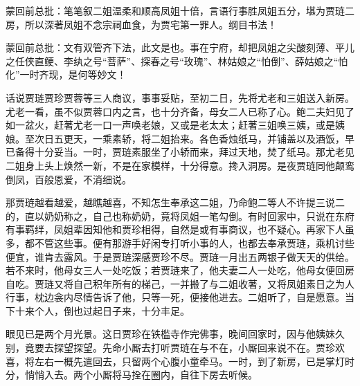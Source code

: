 \begin{parag}
    \begin{note}蒙回前总批：笔笔叙二姐温柔和顺高凤姐十倍，言语行事胜凤姐五分，堪为贾琏二房，所以深著凤姐不念宗祠血食，为贾宅第一罪人。纲目书法！\end{note}
\end{parag}


\begin{parag}
    \begin{note}蒙回前总批：文有双管齐下法，此文是也。事在宁府，却把凤姐之尖酸刻薄、平儿之任侠直鲠、李纨之号“菩萨”、探春之号“玫瑰”、林姑娘之“怕倒”、薛姑娘之“怕化”一时齐现，是何等妙文！\end{note}
\end{parag}


\begin{parag}
    话说贾琏贾珍贾蓉等三人商议，事事妥贴，至初二日，先将尤老和三姐送入新房。尤老一看，虽不似贾蓉口内之言，也十分齐备，母女二人已称了心。鲍二夫妇见了如一盆火，赶著尤老一口一声唤老娘，又或是老太太；赶著三姐唤三姨，或是姨娘。至次日五更天，一乘素轿，将二姐抬来。各色香烛纸马，并铺盖以及酒饭，早已备得十分妥当。一时，贾琏素服坐了小轿而来，拜过天地，焚了纸马。那尤老见二姐身上头上焕然一新，不是在家模样，十分得意。搀入洞房。是夜贾琏同他颠鸾倒凤，百般恩爱，不消细说。
\end{parag}


\begin{parag}
    那贾琏越看越爱，越瞧越喜，不知怎生奉承这二姐，乃命鲍二等人不许提三说二的，直以奶奶称之，自己也称奶奶，竟将凤姐一笔勾倒。有时回家中，只说在东府有事羁绊，凤姐辈因知他和贾珍相得，自然是或有事商议，也不疑心。再家下人虽多，都不管这些事。便有那游手好闲专打听小事的人，也都去奉承贾琏，乘机讨些便宜，谁肯去露风。于是贾琏深感贾珍不尽。贾琏一月出五两银子做天天的供给。若不来时，他母女三人一处吃饭；若贾琏来了，他夫妻二人一处吃，他母女便回房自吃。贾琏又将自己积年所有的梯己，一并搬了与二姐收著，又将凤姐素日之为人行事，枕边衾内尽情告诉了他，只等一死，便接他进去。二姐听了，自是愿意。当下十来个人，倒也过起日子来，十分丰足。
\end{parag}


\begin{parag}
    眼见已是两个月光景。这日贾珍在铁槛寺作完佛事，晚间回家时，因与他姨妹久别，竟要去探望探望。先命小厮去打听贾琏在与不在，小厮回来说不在。贾珍欢喜，将左右一概先遣回去，只留两个心腹小童牵马。一时，到了新房，已是掌灯时分，悄悄入去。两个小厮将马拴在圈内，自往下房去听候。
\end{parag}


